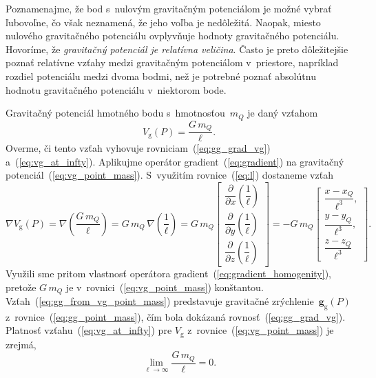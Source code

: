\documentclass[a4paper, 12pt]{book}
\newcommand{\gidx}{\mathrm g}
\let\vec\mathbf
\begin{document}
Poznamenajme, že bod s~nulovým gravitačným potenciálom je možné vybrať 
ľubovoľne, čo však neznamená, že jeho voľba je nedôležitá.  Naopak, miesto 
nulového gravitačného potenciálu ovplyvňuje hodnoty gravitačného potenciálu.  
Hovoríme, že \emph{gravitačný potenciál je relatívna veličina}.  Často je preto 
dôležitejšie poznať relatívne vzťahy medzi gravitačným potenciálom v~priestore, 
napríklad rozdiel potenciálu medzi dvoma bodmi, než je potrebné poznať 
absolútnu hodnotu gravitačného potenciálu v~niektorom bode.

Gravitačný potenciál hmotného bodu s~hmotnosťou~$m_Q$ je daný vzťahom
%
\begin{equation}
\label{eq:vg_point_mass}
V_\gidx(P) = \frac{G \, m_Q}{\ell}{.}
\end{equation}
%
Overme, či tento vzťah vyhovuje rovniciam~(\ref{eq:gg_grad_vg})
a~(\ref{eq:vg_at_infty}).  Aplikujme operátor gradient~(\ref{eq:gradient})
na gravitačný potenciál~(\ref{eq:vg_point_mass}).  S~využitím 
rovnice~(\ref{eq:l}) dostaneme vzťah
%
\begin{equation}
\label{eq:gg_from_vg_point_mass}
\nabla V_\gidx(P) = \nabla \left( \frac{G \, m_Q}{\ell} \right) = G \, m_Q \, 
\nabla \left( \frac{1}{\ell} \right) =
%
G \, m_Q
%
\begin{bmatrix}
\dfrac{\partial}{\partial x} \left( \dfrac{1}{\ell} \right)\\[2ex]
\dfrac{\partial}{\partial y} \left( \dfrac{1}{\ell} \right)\\[2ex]
\dfrac{\partial}{\partial z} \left( \dfrac{1}{\ell} \right)
\end{bmatrix}
%
=
%
-G \, m_Q
%
\begin{bmatrix}
\dfrac{x - x_Q}{\ell^3}{,}\\[2ex]
\dfrac{y - y_Q}{\ell^3}{,}\\[2ex]
\dfrac{z - z_Q}{\ell^3}
\end{bmatrix}
{.}
\end{equation}
%
Využili sme pritom vlastnosť operátora gradient~(\ref{eq:gradient_homogenity}), 
pretože $G \, m_Q$ je v~rovnici~(\ref{eq:vg_point_mass}) konštantou.  
Vzťah~(\ref{eq:gg_from_vg_point_mass}) predstavuje gravitačné zrýchlenie~$\vec 
g_\gidx(P)$ z~rovnice~(\ref{eq:gg_point_mass}), čím bola dokázaná 
rovnosť~(\ref{eq:gg_grad_vg}).  Platnosť vzťahu~(\ref{eq:vg_at_infty}) pre 
$V_\gidx$ z~rovnice~(\ref{eq:vg_point_mass}) je zrejmá,
%
\begin{equation}
\lim_{\ell \to \infty} \frac{G \, m_Q}{\ell} = 0{.}
\end{equation}
\end{document}
